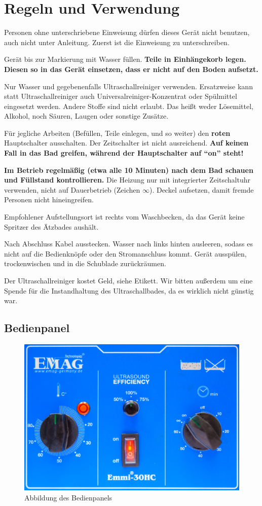 \documentclass{\basedir/fablab-document}
\begin{document}
\section{Regeln und Verwendung}
Personen ohne unterschriebene Einweisung dürfen dieses Gerät nicht benutzen, auch nicht unter Anleitung.
Zuerst ist die Einweisung zu unterschreiben.

Gerät bis zur Markierung mit Wasser füllen.
\textbf{Teile in Einhängekorb legen.
Diesen so in das Gerät einsetzen, dass er nicht auf den Boden aufsetzt.}

Nur Wasser und gegebenenfalls Ultraschallreiniger verwenden.
Ersatzweise kann statt Ultraschallreiniger auch Universalreiniger-Konzentrat oder Spülmittel eingesetzt werden.
Andere Stoffe sind nicht erlaubt.
Das heißt weder Lösemittel, Alkohol, noch Säuren, Laugen oder sonstige Zusätze.

Für jegliche Arbeiten (Befüllen, Teile einlegen, und so weiter) den \textbf{roten} Hauptschalter ausschalten.
Der Zeitschalter ist nicht ausreichend.
\textbf{Auf keinen Fall in das Bad greifen, während der Hauptschalter auf \enquote{on} steht!}

\textbf{Im Betrieb regelmäßig (etwa alle 10 Minuten) nach dem Bad schauen und Füllstand kontrollieren.}
Die Heizung nur mit integrierter Zeitschaltuhr verwenden, nicht auf Dauerbetrieb (Zeichen $\infty$).
Deckel aufsetzen, damit fremde Personen nicht hineingreifen.

Empfohlener Aufstellungsort ist rechts vom Waschbecken, da das Gerät keine Spritzer des Ätzbades aushält.

Nach Abschluss Kabel ausstecken.
Wasser nach links hinten ausleeren, sodass es nicht auf die Bedienknöpfe oder den Stromanschluss kommt.
Gerät ausspülen, trockenwischen und in die Schublade zurückräumen.

Der Ultraschallreiniger kostet Geld, siehe Etikett.
Wir bitten außerdem um eine Spende für die Instandhaltung des Ultraschallbades, da es wirklich nicht günstig war.

\subsection{Bedienpanel}

\begin{figure}
\centering
\includegraphics[width=0.6\linewidth]{img/frontpanel.png}
\caption[Abbildung des Bedienpanels]{Abbildung des Bedienpanels}
\end{figure}
\end{document}
